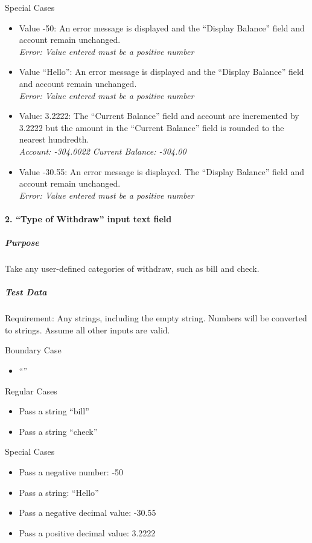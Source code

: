 \documentclass[12pt]{article}
\begin{document}
Special Cases
\begin{itemize}
  \item Value -50: An error message is displayed and the “Display Balance” field and account remain unchanged.\\
{\it Error: Value entered must be a positive number}
  \item Value “Hello”: An error message is displayed and the “Display Balance” field and account remain unchanged.\\
{\it Error: Value entered must be a positive number}
  \item Value: 3.2222: The “Current Balance” field and account are incremented by 3.2222 but the amount in the “Current Balance” field is rounded to the nearest hundredth.\\
{\it Account: -304.0022 Current Balance: -304.00}
  \item Value -30.55: An error message is displayed. The “Display Balance” field and account remain unchanged.\\
{\it Error: Value entered must be a positive number}
\end{itemize}

\paragraph{2. “Type of Withdraw” input text field}
\subparagraph{Purpose} Take any user-defined categories of withdraw, such as bill and check.

\subparagraph{Test Data} Requirement: Any strings, including the empty string. Numbers will be converted to strings. Assume all other inputs are valid.

Boundary Case
\begin{itemize}
  \item “”
\end{itemize}

Regular Cases
\begin{itemize}
  \item Pass a string “bill”
  \item Pass a string “check”
\end{itemize}

Special Cases
\begin{itemize}
  \item Pass a negative number: -50
  \item Pass a string: “Hello”
  \item Pass a negative decimal value: -30.55
  \item Pass a positive decimal value: 3.2222
\end{itemize}
\end{document}
